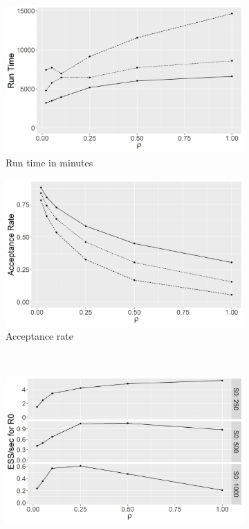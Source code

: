 \documentclass[11pt]{article}
\begin{document}
	
	\begin{figure}
		\centering
		\begin{subfigure}[b]{0.42\textwidth}
			\centering
			\includegraphics[width=\textwidth]{E3_runtime}
			\caption{Run time in minutes}
			\label{fig:E3_runtime}
		\end{subfigure}
		\hfill
		\begin{subfigure}[b]{0.41\textwidth}
			\centering
			\includegraphics[width=\textwidth]{E3_accept}
			\caption{Acceptance rate}
			\label{fig:E3_accept}
		\end{subfigure}
		\\
		\begin{subfigure}[b]{0.41\textwidth}
			\centering
			\includegraphics[width=\textwidth]{E3_facet_ESSsecR0}

\end{subfigure}
\end{figure}
\end{document}
